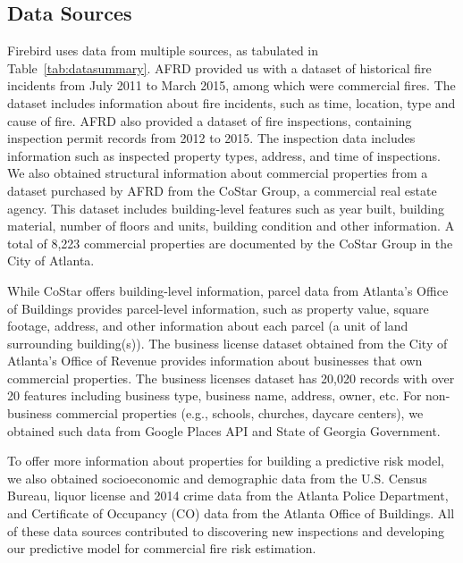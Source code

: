\documentclass{sig-alternate-05-2015}
\begin{document}
{

\subsection{Data Sources}
Firebird uses data from multiple sources, as tabulated in Table~\ref{tab:datasummary}. AFRD provided us with a dataset of  historical fire incidents from July 2011 to March 2015, among which  were commercial fires. The dataset includes information about fire incidents, such as time, location, type and cause of fire. AFRD also provided a dataset of fire inspections, containing  inspection permit records from 2012 to 2015. The inspection data includes information such as inspected property types, address, and time of inspections. We also obtained structural information about commercial properties from a dataset purchased by AFRD from the CoStar Group, a commercial real estate agency. This dataset includes building-level features such as year built, building material, number of floors and units, building condition and other information. A total of 8,223 commercial properties are documented by the CoStar Group in the City of Atlanta. 

While CoStar offers building-level information, parcel data from Atlanta's Office of Buildings provides parcel-level information, such as property value, square footage, address, and other information about each parcel (a unit of land surrounding building(s)). The business license dataset obtained from the City of Atlanta's Office of Revenue provides information about businesses that own commercial properties. The business licenses dataset has 20,020 records with over 20 features including business type, business name, address, owner, etc. For non-business commercial properties (e.g., schools, churches, daycare centers), we obtained such data from Google Places API and State of Georgia Government.

To offer more information about properties for building a predictive risk model, we also obtained socioeconomic and demographic data from the U.S. Census Bureau, liquor license and 2014 crime data from the Atlanta Police Department, and Certificate of Occupancy (CO) data from the Atlanta Office of Buildings. All of these data sources contributed to discovering new inspections and developing our predictive model for commercial fire risk estimation. 

}
\end{document}
